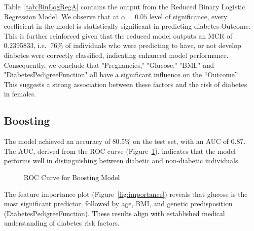 \documentclass[12pt]{article}
\begin{document}
Table~\ref{tab:BinLogRegA} contains the output from the Reduced Binary Logistic Regression Model. We observe that at $\alpha=0.05$ level of significance, every coefficient in the model is statistically significant in predicting diabetes Outcome. This is further reinforced given that the reduced model outputs an MCR of 0.2395833, i.e. $~76\%$ of individuals who were predicting to have, or not develop diabetes were correctly classified, indicating enhanced model performance. Consequently, we conclude that "Pregnancies," "Glucose," "BMI," and "DiabetesPedigreeFunction" all have a significant influence on the “Outcome”. This suggests a strong association between these factors and the risk of diabetes in females. \\


\subsection{Boosting}

The model achieved an accuracy of 80.5\% on the test set, with an AUC of 0.87. The AUC, derived from the ROC curve (Figure~\ref{fig:roc}), indicates that the model performs well in distinguishing between diabetic and non-diabetic individuals.

\begin{figure}[h!]
	\centering
	\caption{ROC Curve for Boosting Model}
	\label{fig:roc}
\end{figure}

The feature importance plot (Figure~\ref{fig:importance}) reveals that glucose is the most significant predictor, followed by age, BMI, and genetic predisposition (DiabetesPedigreeFunction). These results align with established medical understanding of diabetes risk factors.

\end{document}
